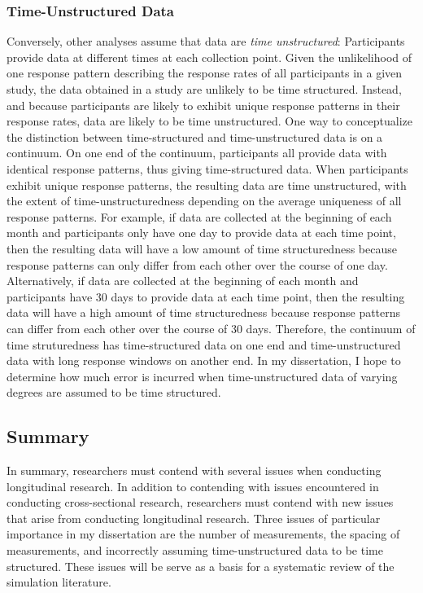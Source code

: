 \documentclass[
12pt, %
twoside,
english]{guelphthesis}
\begin{document}
\hypertarget{time-unstructured-data}{%
\subsubsection{Time-Unstructured Data}\label{time-unstructured-data}}

Conversely, other analyses assume that data are \emph{time unstructured}: Participants provide data at different times at each collection point. Given the unlikelihood of one response pattern describing the response rates of all participants in a given study, the data obtained in a study are unlikely to be time structured. Instead, and because participants are likely to exhibit unique response patterns in their response rates, data are likely to be time unstructured. One way to conceptualize the distinction between time-structured and time-unstructured data is on a continuum. On one end of the continuum, participants all provide data with identical response patterns, thus giving time-structured data. When participants exhibit unique response patterns, the resulting data are time unstructured, with the extent of time-unstructuredness depending on the average uniqueness of all response patterns. For example, if data are collected at the beginning of each month and participants only have one day to provide data at each time point, then the resulting data will have a low amount of time structuredness because response patterns can only differ from each other over the course of one day. Alternatively, if data are collected at the beginning of each month and participants have 30 days to provide data at each time point, then the resulting data will have a high amount of time structuredness because response patterns can differ from each other over the course of 30 days. Therefore, the continuum of time struturedness has time-structured data on one end and time-unstructured data with long response windows on another end. In my dissertation, I hope to determine how much error is incurred when time-unstructured data of varying degrees are assumed to be time structured.

\hypertarget{summary}{%
\subsection{Summary}\label{summary}}

In summary, researchers must contend with several issues when conducting longitudinal research. In addition to contending with issues encountered in conducting cross-sectional research, researchers must contend with new issues that arise from conducting longitudinal research. Three issues of particular importance in my dissertation are the number of measurements, the spacing of measurements, and incorrectly assuming time-unstructured data to be time structured. These issues will be serve as a basis for a systematic review of the simulation literature.
\end{document}
